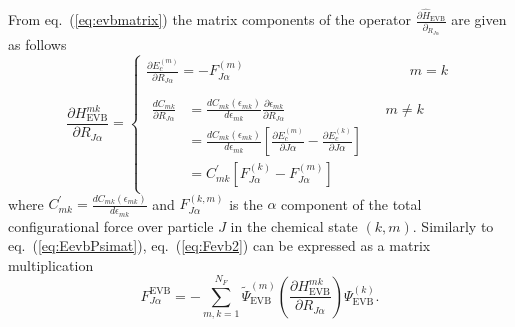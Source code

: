 From eq.~(\ref{eq:evbmatrix}) the matrix components of the operator 
$\frac{\partial \hat{H}_{\text{EVB}}}{\partial_{R_{J\alpha}}}$ are given as follows
\begin{equation}\label{eq:gradevb}
\frac{\partial H^{mk}_{\text{EVB}}}{\partial R_{J\alpha}}
=\begin{cases}
\frac{\partial E_{c}^{(m)}}{\partial R_{J\alpha}}=-F^{(m)}_{J\alpha} \,\,\,\,\,\,\,\,\,\,\,\,\,\,\,\,\,\,\,\,\,\,\,\,\,\,\,\,\,\,\,\,\,\,\,\,\,\,\,\,\,\,\,\,\,\,\,\,\,\,\,\,\,\,\,\,\,\,\,\,\,\,\,\,\,\,\,\,\,\,\, m=k  \\
\\
\begin{aligned}
\frac{d C_{mk}}{\partial R_{J\alpha}} &=\frac{d C_{mk}(\epsilon_{mk})}{d\epsilon_{mk}}\frac{\partial \epsilon_{mk}}{\partial R_{J\alpha}}\,\,\,\,\,\,\,\,\,\,\,\,\,\,\,\,\,\,\,\,\,\,\,\,\,\,\,\,\,\,\,\,\,\,\,\,\,\,\,\,\,\,\,  m \ne k\\
                                                          &=\frac{d C_{mk}(\epsilon_{mk})}{d\epsilon_{mk}} \left[\frac{\partial E_{c}^{(m)}}{\partial J\alpha}-\frac{\partial E_{c}^{(k)}}{\partial J\alpha}\right]\\
                                                          &=C^{\prime}_{mk}[F^{(k)}_{J\alpha}-F^{(m)}_{J\alpha}] 
\end{aligned}
\end{cases} 
\end{equation}
where $C^{\prime}_{mk}=\frac{d C_{mk}(\epsilon_{mk})}{d\epsilon_{mk}}$ and  $F^{(k,m)}_{J\alpha}$ is the $\alpha$ component of the total configurational force over particle $J$ in the chemical state $(k,m)$. Similarly to eq.~(\ref{eq:EevbPsimat}), eq.~(\ref{eq:Fevb2}) can be expressed as a matrix multiplication
\begin{equation}\label{eq:FevbPsimat}
F_{J\alpha}^{\text{EVB}}=-\sum_{m,k=1}^{N_F} \tilde{\Psi}^{(m)}_{\text{EVB}} \left(\frac{\partial H^{mk}_{\text{EVB}}}{\partial R_{J\alpha}}\right) \Psi^{(k)}_{\text{EVB}}.
\end{equation}	


